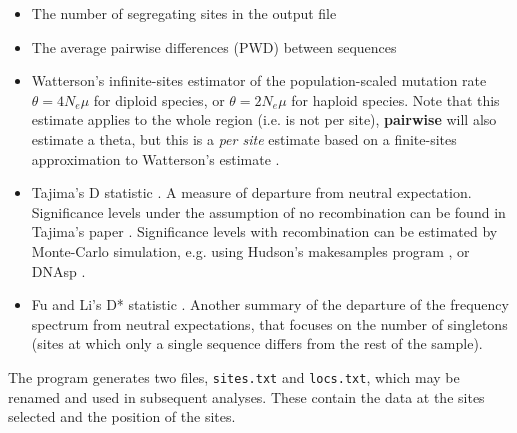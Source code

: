 \documentclass[a4paper,10pt,fullpage]{article}
\begin{document}
\begin{itemize}
\item The number of segregating sites in the output file

\item The average pairwise differences (PWD) between sequences

\item Watterson's infinite-sites estimator of the
population-scaled mutation rate $\theta=4N_e\mu$ for diploid
species, or $\theta=2N_e\mu$ for haploid species.  Note that this
estimate applies to the whole region (i.e. is not per site), {\bf
pairwise} will also estimate a theta, but this is a {\it per site}
estimate based on a finite-sites approximation to Watterson's
estimate \cite{McVeanetal02}.

\item Tajima's D statistic \cite{Tajima89}.  A measure of
departure from neutral expectation.  Significance levels under the
assumption of no recombination can be found in Tajima's paper
\cite{Tajima89}. Significance levels with recombination can be
estimated by Monte-Carlo simulation, e.g. using Hudson's
makesamples program \cite{Hudson02}, or DNAsp \cite{Rozasetal03}.

\item Fu and Li's D* statistic \cite{FuLi93}.  Another summary of
the departure of the frequency spectrum from neutral expectations,
that focuses on the number of singletons (sites at which only a
single sequence differs from the rest of the sample).

\end{itemize}

\noindent The program generates two files, {\verb+sites.txt+} and {\verb+locs.txt+}, which may be renamed and used in subsequent analyses. These
contain the data at the sites selected and the position of the
sites.
\end{document}
